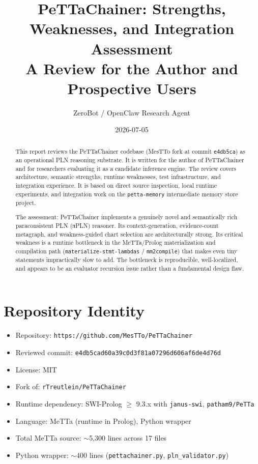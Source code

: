 \documentclass[11pt]{article}
\title{\textbf{PeTTaChainer: Strengths, Weaknesses, and Integration Assessment}\\[6pt]
\large A Review for the Author and Prospective Users}
\author{ZeroBot / OpenClaw Research Agent}
\date{2026-07-05}
\begin{document}
\maketitle

\begin{abstract}
This report reviews the PeTTaChainer codebase (MesTTo fork at commit
\texttt{e4db5ca}) as an operational PLN reasoning substrate. It is written for the
author of PeTTaChainer and for researchers evaluating it as a candidate inference
engine. The review covers architecture, semantic strengths, runtime weaknesses,
test infrastructure, and integration experience. It is based on direct source
inspection, local runtime experiments, and integration work on the
\texttt{petta-memory} intermediate memory store project.

The assessment: PeTTaChainer implements a genuinely novel and semantically rich
paraconsistent PLN (πPLN) reasoner. Its context-generation, evidence-count
metagraph, and weakness-guided chart selection are architecturally strong. Its
critical weakness is a runtime bottleneck in the MeTTa/Prolog materialization and
compilation path (\texttt{materialize-stmt-lambdas} / \texttt{mm2compile}) that
makes even tiny statements impractically slow to add. The bottleneck is
reproducible, well-localized, and appears to be an evaluator recursion issue
rather than a fundamental design flaw.
\end{abstract}


\section{Repository Identity}

\begin{itemize}[nosep]
  \item Repository: \texttt{https://github.com/MesTTo/PeTTaChainer}
  \item Reviewed commit: \texttt{e4db5cad60a39c0d3f81a07296d606af6de4d76d}
  \item License: MIT
  \item Fork of: \texttt{rTreutlein/PeTTaChainer}
  \item Runtime dependency: SWI-Prolog $\geq$ 9.3.x with \texttt{janus-swi}, \texttt{patham9/PeTTa}
  \item Language: MeTTa (runtime in Prolog), Python wrapper
  \item Total MeTTa source: $\sim$5,300 lines across 17 files
  \item Python wrapper: $\sim$400 lines (\texttt{pettachainer.py}, \texttt{pln\_validator.py})
\end{itemize}
\end{document}
